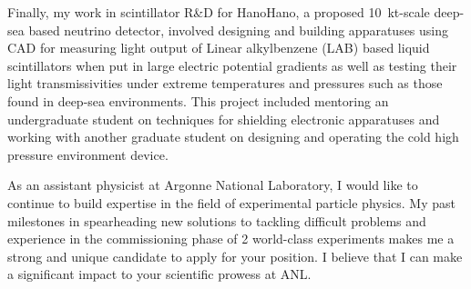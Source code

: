 \documentclass[10pt]{article} %
\begin{document}
Finally, my work in scintillator R\&D for HanoHano, a proposed
\SI{10}{\kilo\tonne}-scale deep-sea based neutrino detector, involved designing
and building apparatuses using CAD for measuring light output of Linear
alkylbenzene (LAB) based liquid scintillators when put in large electric
potential gradients as well as testing their light transmissivities under
extreme temperatures and pressures such as those found in deep-sea
environments. This project included mentoring an undergraduate student on
techniques for shielding electronic apparatuses and working with another
graduate student on designing and operating the cold high pressure environment
device.

As an assistant physicist at Argonne National Laboratory, I would like to
continue to build expertise in the field of experimental particle physics. My
past milestones in spearheading new solutions to tackling difficult problems
and experience in the commissioning phase of 2 world-class experiments makes me
a strong and unique candidate to apply for your position. I believe that I can
make a significant impact to your scientific prowess at ANL.
\end{document}
